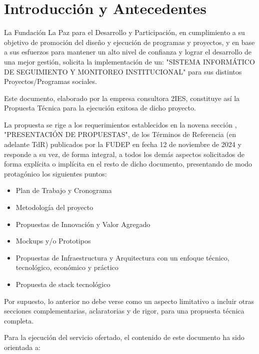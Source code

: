 \section{Introducción y Antecedentes}

La Fundación La Paz para el Desarrollo y Participación, en cumplimiento a su objetivo de promoción del diseño y ejecución de programas y proyectos, y en base a sus esfuerzos para mantener un alto nivel de confianza y lograr el desarrollo de una mejor gestión,
solicita la implementación de un:
"SISTEMA INFORMÁTICO DE SEGUIMIENTO Y MONITOREO INSTITUCIONAL"
para sus distintos Proyectos/Programas sociales.

Este documento, elaborado por la empresa consultora 2IES, constituye así la Propuesta Técnica para la ejecución exitosa de dicho proyecto.

La propuesta se rige a los requerimientos establecidos en la novena sección , "PRESENTACIÓN DE PROPUESTAS", de los Términos de Referencia (en adelante TdR) publicados por la FUDEP en fecha 12 de noviembre de 2024 
y responde a su vez, de forma integral, a todos los demás aspectos solicitados de forma explícita o implícita en el resto de dicho documento,
presentando de modo protagónico los siguientes puntos:

\begin{itemize}
    \item Plan de Trabajo y Cronograma
    \item Metodología del proyecto
    \item Propuestas de Innovación y Valor Agregado
    \item Mockups y/o Prototipos
    \item Propuestas de Infraestructura y Arquitectura con un enfoque técnico, tecnológico, económico y práctico
    \item Propuesta de stack tecnológico
\end{itemize}

Por supuesto, lo anterior no debe verse como un aspecto limitativo a incluir otras secciones complementarias, aclaratorias y de rigor, para una propuesta técnica completa.

Para la ejecución del servicio ofertado, el contenido de este documento ha sido orientada a:

